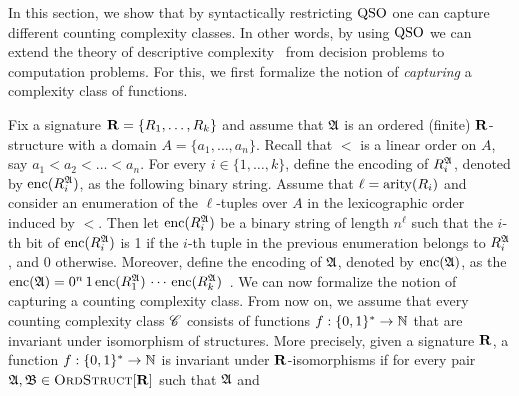 
In this section, we show that by syntactically restricting ${\rm QSO}$ one can capture different counting complexity classes. 
In other words, by using ${\rm QSO}$ we can extend the theory of descriptive complexity~\cite{immerman1999descriptive} from decision problems to computation problems. 
For this, we first formalize the notion of \emph{capturing} a complexity class of functions.

Fix a signature $\mathbf{R} = \{R_1, \ldots, R_k\}$ and assume that $\mathfrak{A}$ is an ordered (finite) $\mathbf{R}$-structure with a domain $A = \{a_1, \ldots, a_n\}$.
Recall that  $<$ is a linear order on $A$, say $a_1 < a_2 < \ldots < a_n$. For every $i \in \{1, \ldots, k\}$, define the encoding of $R_i^{\mathfrak{A}}$, denoted by ${\rm enc}(R_i^{\mathfrak{A}})$, as the following binary string. Assume that $\ell = {\rm arity}(R_i)$ and consider an enumeration of the $\ell$-tuples over $A$ in the lexicographic order induced by $<$. 
Then let ${\rm enc}(R_i^{\mathfrak{A}})$ be a binary string of length $n^\ell$ such that the $i$-th bit of ${\rm enc}(R_i^{\mathfrak{A}})$ is 1 if the $i$-th tuple in the previous enumeration belongs to $R_i^{\mathfrak{A}}$, and 0 otherwise. Moreover, define the encoding of $\mathfrak{A}$, denoted by ${\rm enc}(\mathfrak{A})$, as the 
${\rm enc}(\mathfrak{A}) =  0^n \, 1 \, {\rm enc}(R_1^{\mathfrak{A}}) \, \cdots \, {\rm enc}(R_k^{\mathfrak{A}})$~\cite{L04}. 
We can now formalize the notion of capturing a counting complexity class. From now on, we assume that every counting complexity class $\mathscr{C}$ consists of functions $f : \{0,1\}^* \to \mathbb{N}$ that are invariant under isomorphism of structures. More precisely, given a signature $\mathbf{R}$, a function $f : \{0,1\}^* \to \mathbb{N}$ is invariant under $\mathbf{R}$-isomorphisms if for every pair $\mathfrak{A}, \mathfrak{B} \in \text{\sc OrdStruct}[\mathbf{R}]$ such that $\mathfrak{A}$ and 
